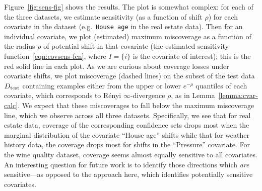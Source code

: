 Figure~\ref{fig:sens-fig} shows the results. The plot is somewhat complex:
for each of the three datasets, we estimate sensitivity (as a function of
shift $\rho$) for each covariate in the dataset (e.g.\ \texttt{House age} in
the real estate data). Then for an individual covariate, we plot (estimated)
maximum miscoverage as a function of the radius $\rho$ of potential shift in
that covariate (the estimated sensitivity function~\eqref{eqn:covsens-fcn},
where $I = \{i\}$ is the covariate of interest); this is the red solid line
in each plot. As we are curious about coverage losses under covariate
shifts, we plot miscoverage (dashed lines) on the subset of the test data
$D_{\textrm{test}}$ containing examples either from the upper or lower $e^{-\rho}$
quantiles of each covariate, which corresponds to R\'{e}nyi
$\infty$-divergence $\rho$, as in Lemma~\ref{lemma:cvar-calc}.  We expect
that these miscoverages to fall below the maximum miscoverage line,
which we observe across all three datasets.
Specifically, we see that for real estate data, coverage of the
corresponding confidence sets drops most when the marginal distribution of
the covariate ``House age'' shifts while that for weather history data, the
coverage drops most for shifts in the ``Pressure'' covariate.  For the wine
quality dataset, coverage seems almost equally sensitive to all covariates.
An interesting question for future work is to identify those directions
which \emph{are} sensitive---as opposed to the approach here, which
identifies potentially sensitive covariates.

